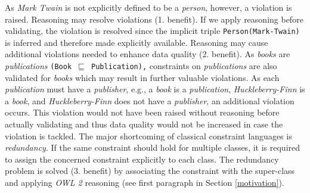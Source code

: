 \documentclass{acm_proc_article-sp}
\newcommand{\ms}[1]{%
  \texttt{#1}
}
\newcommand{\tb}[1]{\todo[size=\small, color=green!40]{\textbf{Thomas:} #1}}
\begin{document}
As \emph{Mark Twain} is not explicitly defined to be a \emph{person}, however, a violation is raised.
Reasoning may resolve violations (1. benefit). If we apply reasoning before validating, the violation is resolved since the implicit triple {\small\ms{Person(Mark-Twain)}} is inferred and therefore made explicitly available. 
Reasoning may cause additional violations needed to enhance data quality (2. benefit).
As \emph{books} are \emph{publications} {\small\ms{(Book $\sqsubseteq$ Publication),}} constraints on \emph{publications} are also validated for \emph{books} 
which may result in further valuable violations.
As each \emph{publication} must have a \emph{publisher}, e.g., a \emph{book} is a \emph{publication}, {\em Huckleberry-Finn} is a \emph{book}, and {\em Huckleberry-Finn} does not have a \emph{publisher}, 
an additional violation occurs.
This violation would not have been raised without reasoning before actually validating and 
thus data quality would not be increased in case the violation is tackled.
The major shortcoming of classical constraint languages is \emph{redundancy}.
If the same constraint should hold for multiple classes, it is required to assign the concerned constraint explicitly to each class.
The redundancy problem is solved (3. benefit) by associating the constraint with the super-class and applying \emph{OWL 2} reasoning (see first paragraph in Section \ref{motivation}).

\end{document}
